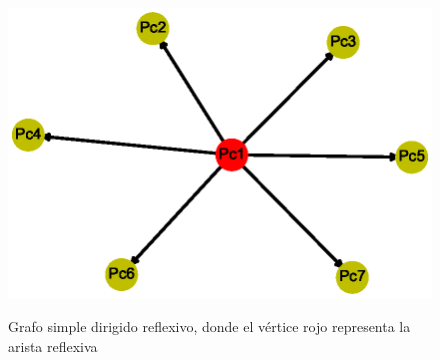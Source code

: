 \documentclass{article}
\begin{document}
\begin{center}

\end{center}
\begin{figure}[h]
\begin{center}
\includegraphics[scale=0.7]{Graf6.eps}\\
\caption{Grafo simple dirigido reflexivo, donde el vértice rojo representa la arista reflexiva}
\end{center}
\end{figure}
\end{document}
